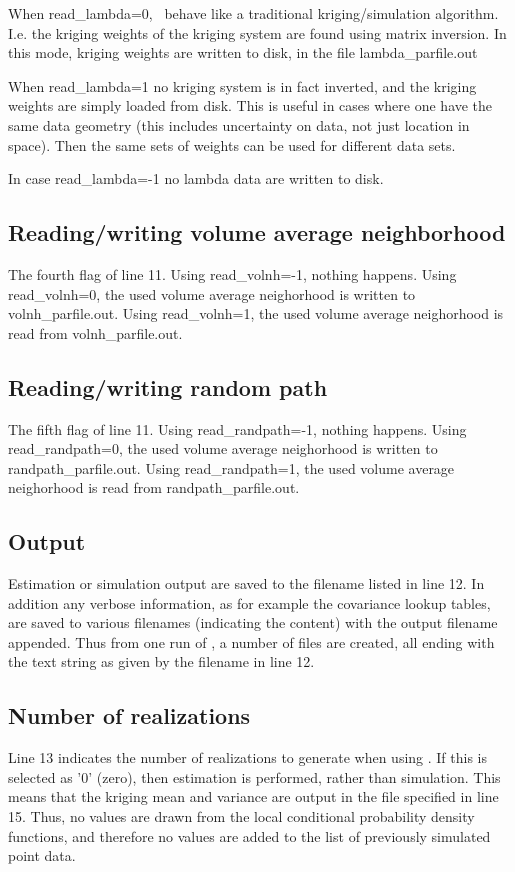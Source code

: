 \documentclass[12t]{article}
\begin{document}
When read\_lambda=0, \visimprog~behave like a traditional kriging/simulation algorithm. I.e. the kriging weights of the kriging system are found using matrix inversion. In this mode, kriging weights are written to disk, in the file lambda\_parfile.out

When read\_lambda=1 no kriging system is in fact inverted, and the kriging weights are simply loaded from disk. This is useful in cases where one have the same data geometry (this includes uncertainty on data, not just location in space). Then the same sets of weights can be used for different data sets.

In case read\_lambda=-1 no lambda data are written to disk.


\subsection{Reading/writing volume average neighborhood}
The fourth flag of line 11.
Using read\_volnh=-1, nothing happens.
Using read\_volnh=0, the used volume average neighorhood is written to volnh\_parfile.out.
Using read\_volnh=1, the used volume average neighorhood is read from volnh\_parfile.out.
\subsection{Reading/writing random path}
The fifth flag of line 11.
Using read\_randpath=-1, nothing happens.
Using read\_randpath=0, the used volume average neighorhood is written to randpath\_parfile.out.
Using read\_randpath=1, the used volume average neighorhood is read from randpath\_parfile.out.


\subsection{Output}
Estimation or simulation output are saved to the filename listed in line 12. In addition any verbose information, as for example the covariance lookup tables, are saved to various filenames (indicating the content) with the output filename appended. Thus from one run of \visimprog, a number of files are created, all ending with the text string as given by the filename in line 12.

\subsection{Number of realizations}
Line 13 indicates the number of realizations to generate when using \visimprog. If this is selected as '0' (zero), then estimation is performed, rather than simulation. This means that the kriging mean and variance are output in the file specified in line 15. Thus, no values are drawn from the local conditional probability density functions, and therefore no values are added to the list of previously simulated point data.
\end{document}
